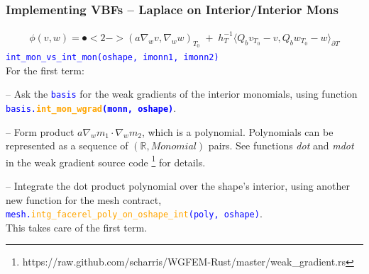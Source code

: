 \documentclass[compress]{beamer}
\begin{document}
\begin{frame}
  \frametitle{Implementing VBFs -- Laplace on Interior/Interior Mons}
  \vspace{-.56cm}
  \begin{align*}
    \mathfrak \phi(v,w) = \spot<2->{(a \nabla_w v,\nabla_w w)_{\scriptscriptstyle T_0}} \;+\;
    h_T^{-1}\langle Q_b v_{\scriptscriptstyle T_0} - v,Q_b w_{\scriptscriptstyle T_0} - w \rangle_{\partial T}
  \end{align*}
  \texttt{\textcolor{blue}{int\_mon\_vs\_int\_mon(oshape, imonn1, imonn2)}}\\
  \pause
  \vspace{.2cm}
  For the first term:\\
  \uncover<+-> {
  -- Ask the \texttt{\textcolor{blue}{basis}} for the weak gradients of the interior monomials, using
  function {\small \texttt{\textcolor{blue}{basis.\textbf{\textcolor{orange}{int\_mon\_wgrad}(monn, oshape)}}}}.
      
  \vspace{.1cm}
  \uncover<+-> {
  -- Form product $a \nabla_w m_1 \cdot \nabla_w m_2$, which is a polynomial. Polynomials can be represented as a sequence
  of $(\mathbb{R}, Monomial)$ pairs. See functions \emph{dot} and \emph{mdot} in the weak gradient source code
  \footnote{https://raw.github.com/scharris/WGFEM-Rust/master/weak\_gradient.rs} for details.
       
  \vspace{.1cm}
  \uncover<+-> {
  -- Integrate the dot product polynomial over the shape's interior, using another new function for the mesh contract,\\
  \texttt{\small \textcolor{blue}{mesh.\textcolor{orange}{intg\_facerel\_poly\_on\_oshape\_int}(poly, oshape)}}.\\

  \vspace{.15cm}
  This takes care of the first term.
  }}}
\end{frame}
\end{document}
